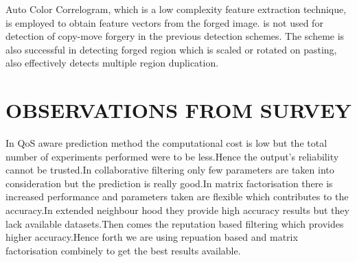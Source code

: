 \bigskip
Auto Color Correlogram, which is a low complexity feature extraction technique, is employed to obtain feature vectors from the forged image. \cite{malvi} is not used for detection of copy-move forgery in the previous detection schemes. The scheme is also successful in detecting forged region which is scaled or rotated on pasting, also effectively detects multiple region duplication. 

\section{OBSERVATIONS FROM SURVEY}
In QoS aware prediction method the computational cost is low but the total number of experiments performed were to be less.Hence the output's reliability cannot be trusted.In collaborative filtering only few parameters are taken into consideration but the prediction is really good.In matrix factorisation there is increased performance and parameters taken are flexible which contributes to the accuracy.In extended neighbour hood they provide high accuracy results but they lack available datasets.Then comes the reputation based filtering which provides higher accuracy.Hence forth we are using repuation based and matrix factorisation combinely to get the best results available.



 
